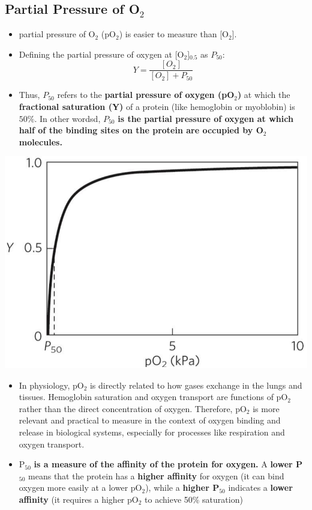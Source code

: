 \documentclass[10pt]{article}
\begin{document}
\subsection*{Partial Pressure of O$_2$}
\begin{itemize}
    \item partial pressure of O$_2$ (pO$_2$) is easier to measure than [O$_2$].
    \item Defining the partial pressure of oxygen at [O$_2$]$_{0.5}$ as $P_{50}$:
    \[Y = \frac{[O_2]}{[O_2] + P_{50}}\]
    \item Thus, $P_{50}$ refers to the \textbf{partial pressure of oxygen (pO$_2$)} at which the \textbf{fractional saturation (Y)} of a protein (like hemoglobin or myoblobin) is $50\%$.  In other wordsd, $P_{50}$ \textbf{is the partial pressure of oxygen at which half of the binding sites on the protein are occupied by O$_2$ molecules.}
\end{itemize}
\begin{center}
    \includegraphics*[scale=0.6]{L2_9.png}
\end{center}
\begin{itemize}
    \item In physiology, pO$_2$ is directly related to how gases exchange in the lungs and tissues.  Hemoglobin saturation and oxygen transport are functions of pO$_2$ rather than the direct concentration of oxygen.  Therefore, pO$_2$ is more relevant and practical to measure in the context of oxygen binding and release in biological systems, especially for processes like respiration and oxygen transport.
    \item P$_{50}$ \textbf{is a measure of the affinity of the protein for oxygen.}  A \textbf{lower P$_{50}$} means that the protein has a \textbf{higher affinity} for oxygen (it can bind oxygen more easily at a lower pO$_2$), while a \textbf{higher P$_{50}$} indicates a \textbf{lower affinity} (it requires a higher pO$_2$ to achieve 50\% saturation)
\end{itemize}
\end{document}
